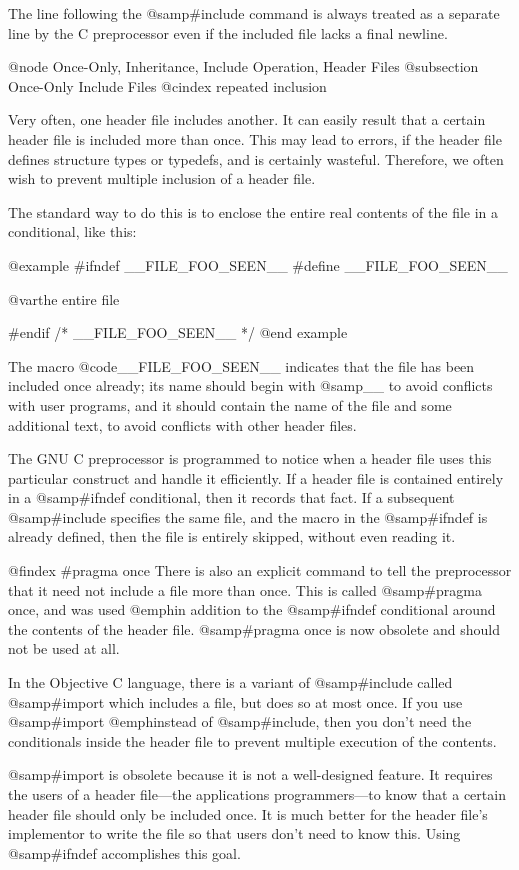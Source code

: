{The line following the @samp{#include} command is always treated as a
separate line by the C preprocessor even if the included file lacks a final
newline.

@node Once-Only, Inheritance, Include Operation, Header Files
@subsection Once-Only Include Files
@cindex repeated inclusion

Very often, one header file includes another.  It can easily result that a
certain header file is included more than once.  This may lead to errors,
if the header file defines structure types or typedefs, and is certainly
wasteful.  Therefore, we often wish to prevent multiple inclusion of a
header file.

The standard way to do this is to enclose the entire real contents of the
file in a conditional, like this:

@example
#ifndef __FILE_FOO_SEEN__
#define __FILE_FOO_SEEN__

@var{the entire file}

#endif /* __FILE_FOO_SEEN__ */
@end example

The macro @code{__FILE_FOO_SEEN__} indicates that the file has been
included once already; its name should begin with @samp{__} to avoid
conflicts with user programs, and it should contain the name of the file
and some additional text, to avoid conflicts with other header files.

The GNU C preprocessor is programmed to notice when a header file uses
this particular construct and handle it efficiently.  If a header file
is contained entirely in a @samp{#ifndef} conditional, then it records
that fact.  If a subsequent @samp{#include} specifies the same file,
and the macro in the @samp{#ifndef} is already defined, then the file
is entirely skipped, without even reading it.

@findex #pragma once
There is also an explicit command to tell the preprocessor that it need
not include a file more than once.  This is called @samp{#pragma once},
and was used @emph{in addition to} the @samp{#ifndef} conditional around
the contents of the header file.  @samp{#pragma once} is now obsolete
and should not be used at all.

In the Objective C language, there is a variant of @samp{#include}
called @samp{#import} which includes a file, but does so at most once.
If you use @samp{#import} @emph{instead of} @samp{#include}, then you
don't need the conditionals inside the header file to prevent multiple
execution of the contents.

@samp{#import} is obsolete because it is not a well-designed feature.
It requires the users of a header file---the applications
programmers---to know that a certain header file should only be included
once.  It is much better for the header file's implementor to write the
file so that users don't need to know this.  Using @samp{#ifndef}
accomplishes this goal.

}

